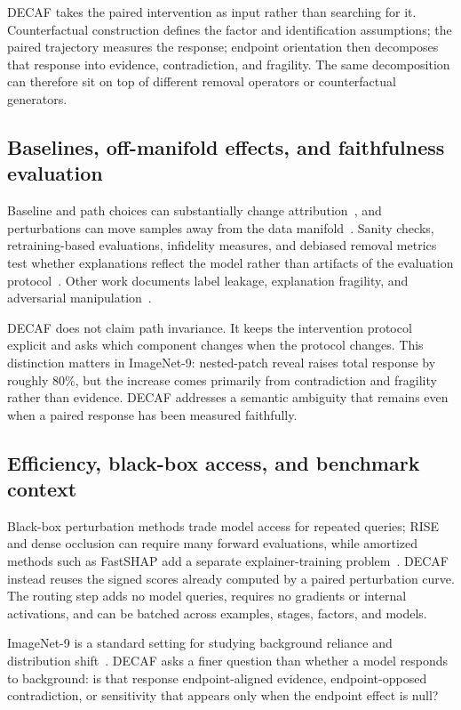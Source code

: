 DECAF takes the paired intervention as input rather than searching for it. Counterfactual construction defines the factor and identification assumptions; the paired trajectory measures the response; endpoint orientation then decomposes that response into evidence, contradiction, and fragility. The same decomposition can therefore sit on top of different removal operators or counterfactual generators.

\subsection{Baselines, off-manifold effects, and faithfulness evaluation}

Baseline and path choices can substantially change attribution~\citep{sturmfels2020baselines,kindermans2019unreliability}, and perturbations can move samples away from the data manifold~\citep{frye2020manifold}. Sanity checks, retraining-based evaluations, infidelity measures, and debiased removal metrics test whether explanations reflect the model rather than artifacts of the evaluation protocol~\citep{adebayo2018sanity,hooker2019benchmark,yeh2019infidelity,rong2022consistent}. Other work documents label leakage, explanation fragility, and adversarial manipulation~\citep{jethani2023labelleakage,ghorbani2019interpretation,dombrowski2019explanations,slack2020fooling}.

DECAF does not claim path invariance. It keeps the intervention protocol explicit and asks which component changes when the protocol changes. This distinction matters in ImageNet-9: nested-patch reveal raises total response by roughly $80\%$, but the increase comes primarily from contradiction and fragility rather than evidence. DECAF addresses a semantic ambiguity that remains even when a paired response has been measured faithfully.

\subsection{Efficiency, black-box access, and benchmark context}

Black-box perturbation methods trade model access for repeated queries; RISE and dense occlusion can require many forward evaluations, while amortized methods such as FastSHAP add a separate explainer-training problem~\citep{petsiuk2018rise,jethani2022fastshap}. DECAF instead reuses the signed scores already computed by a paired perturbation curve. The routing step adds no model queries, requires no gradients or internal activations, and can be batched across examples, stages, factors, and models.

ImageNet-9 is a standard setting for studying background reliance and distribution shift~\citep{xiao2021noise,geirhos2020shortcut}. DECAF asks a finer question than whether a model responds to background: is that response endpoint-aligned evidence, endpoint-opposed contradiction, or sensitivity that appears only when the endpoint effect is null?
